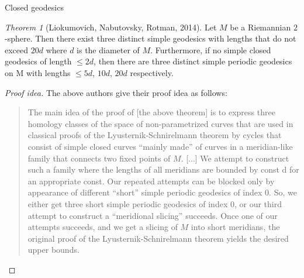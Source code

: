 \documentclass{article}
\theoremstyle{definition}
\theoremstyle{remark}
\newtheorem{theorem}{Theorem}[section]
\begin{document}
\begin{section}{Closed geodesics}
  \begin{theorem}[Liokumovich, Nabutovsky, Rotman, 2014]
    Let $M$ be a Riemannian $2$-sphere. Then there exist three distinct simple
    geodesics with lengths that do not exceed $20d$ where $d$ is the diameter
    of $M$.
    Furthermore, if no simple closed geodesics of length $\leq 2d$, then there
    are three distinct simple periodic geodesics on M with lengths
    $\leq 5d$, $10d$,  $20d$ respectively.
  \end{theorem}
  \begin{proof}[Proof idea]
    The above authors give their proof idea as follows: \begin{quote}
      The main idea of the proof of [the above theorem] is to express three homology
      classes of the space of non-parametrized curves that are used in classical
      proofs of the Lyusternik-Schnirelmann theorem by cycles that consist of
      simple closed curves ``mainly made'' of curves in a meridian-like family
      that connects two fixed points of $M$. [...] We attempt to construct such
      a family where the lengths of all meridians are bounded by const d for an
      appropriate const. Our repeated attempts can be blocked only by appearance
      of different “short” simple periodic geodesics of index 0. So, we either
      get three short simple periodic geodesics of index 0, or our third attempt
      to construct a “meridional slicing” succeeds. Once one of our attempts
      succeeds, and we get a slicing of $M$ into short meridians, the original
      proof of the Lyusternik-Schnirelmann theorem yields the desired upper
      bounds.
    \end{quote}
  \end{proof}
\end{section}
\end{document}
